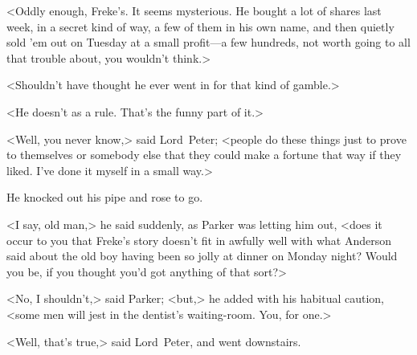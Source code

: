 <Oddly enough, Freke's. It seems mysterious. He bought a lot of shares last week, in a secret kind of way, a few of them in his own name, and then quietly sold 'em out on Tuesday at a small profit—a few hundreds, not worth going to all that trouble about, you wouldn't think.>

<Shouldn't have thought he ever went in for that kind of gamble.>

<He doesn't as a rule. That's the funny part of it.>

<Well, you never know,> said Lord~Peter; <people do these things just to prove to themselves or somebody else that they could make a fortune that way if they liked. I've done it myself in a small way.>

He knocked out his pipe and rose to go.

<I say, old man,> he said suddenly, as Parker was letting him out, <does it occur to you that Freke's story doesn't fit in awfully well with what Anderson said about the old boy having been so jolly at dinner on Monday night? Would you be, if you thought you'd got anything of that sort?>

<No, I shouldn't,> said Parker; <but,> he added with his habitual caution, <some men will jest in the dentist's waiting-room. You, for one.>

<Well, that's true,> said Lord~Peter, and went downstairs.

